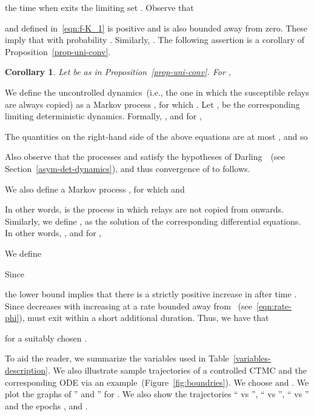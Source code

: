 \documentclass[10pt,journal,letterpaper]{IEEEtran}
\newtheorem{corollary}{Corollary}[section]
\begin{document}
the time when  exits the limiting set .
Observe that

 and  defined in~\eqref{eqn:f-K_1} is positive and is also bounded away from zero.
 These imply that  with probability .
Similarly, . The following assertion is a
corollary of Proposition~\ref{prop-uni-conv}.
\begin{corollary}
\label{cor:apprx-bdry} Let  be as in
Proposition~\ref{prop-uni-conv}. For ,

\end{corollary}

We define the uncontrolled dynamics~(i.e., the one in which the
susceptible relays are always copied) as a Markov process
,  for which
. Let ,
 be the corresponding limiting deterministic dynamics.
Formally, , and for ,

The quantities on the right-hand side of the above equations are at
most , and so

Also observe that the processes  and 
satisfy the hypotheses of Darling~\cite{stochproc.darling02fluid-limits}~(see Section~\ref{asym-det-dynamics}),
and thus convergence of  to  follows.


We also define a Markov process ,  for which
 and

In other words,  is the process in which relays are
not copied from  onwards. Similarly, we define
,  as
the solution of the corresponding differential equations. In other
words, , and for ,

 We define

Since

the lower bound implies that there is a strictly positive increase
in  after time . Since  decreases
with increasing  at a rate bounded away from
~(see~\ref{eqn:rate-phi}),  must exit 
within a short additional duration. Thus, we have that

for a suitably chosen .


To aid the reader, we summarize
the variables used in Table~\ref{variables-description}.
We also illustrate sample trajectories of a controlled CTMC and the corresponding
ODE via an example~(Figure~\ref{fig:boundries}). We choose 
and . We plot the graphs of '' and ''
for . We also show the trajectories `` vs '', `` vs '',  `` vs ''
and the epochs ,  and .
\end{document}
